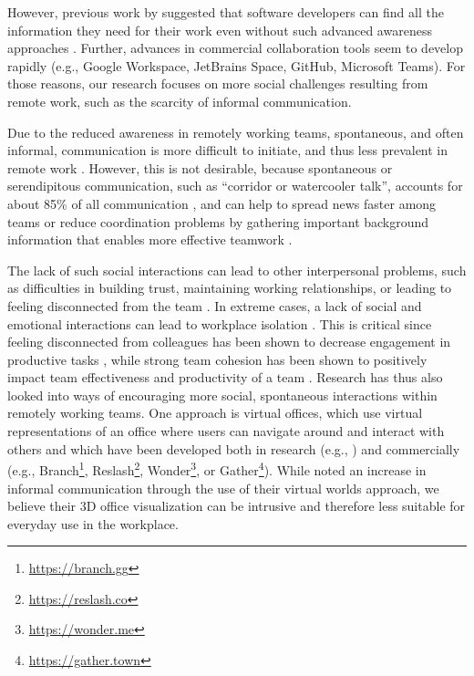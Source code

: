 However, previous work by \citeauthor{gutwin2004group} suggested that software developers can find all the information they need for their work even without such advanced awareness approaches \autocite{gutwin2004group}. Further, advances in commercial collaboration tools seem to develop rapidly (e.g., Google Workspace, JetBrains Space, GitHub, Microsoft Teams). For those reasons, our research focuses on more social challenges resulting from remote work, such as the scarcity of informal communication.

Due to the reduced awareness in remotely working teams, spontaneous, and often informal, communication is more difficult to initiate, and thus less prevalent in remote work \autocite{kraut1988patterns, sengupta2006research, herbsleb2007global, hinds2005understanding}. However, this is not desirable, because spontaneous or serendipitous communication, such as \enquote{corridor or watercooler talk}, accounts for about 85\% of all communication \autocite{kraut1990informal}, and can help to spread news faster among teams \autocite{herbsleb2000distance} or reduce coordination problems \autocite{herbsleb1999architectures} by gathering important background information that enables more effective teamwork \autocite{lanubile2007collaboration, herbsleb2001global}. 

The lack of such social interactions can lead to other interpersonal problems, such as difficulties in building trust, maintaining working relationships, or leading to feeling disconnected from the team \autocite{comella2020revisiting, olson2006bridging}. In extreme cases, a lack of social and emotional interactions can lead to workplace isolation \autocite{marshall2007workplace, gorlick2020productivity, mulki2009set}. This is critical since feeling disconnected from colleagues has been shown to decrease engagement in productive tasks \autocite{lostFocus2020}, while strong team cohesion has been shown to positively impact team effectiveness and productivity of a team \autocite{carlson2017virtual}. Research has thus also looked into ways of encouraging more social, spontaneous interactions within remotely working teams. One approach is virtual offices, which use virtual representations of an office where users can navigate around and interact with others and which have been developed both in research (e.g., \autocite{ lou2012presencescape}) and commercially (e.g., Branch\footnote{\url{https://branch.gg}}, Reslash\footnote{\url{https://reslash.co}}, Wonder\footnote{\url{https://wonder.me}}, or Gather\footnote{\url{https://gather.town}}). While \textcite{lou2012presencescape} noted an increase in informal communication through the use of their virtual worlds approach, we believe their 3D office visualization can be intrusive and therefore less suitable for everyday use in the workplace. 

